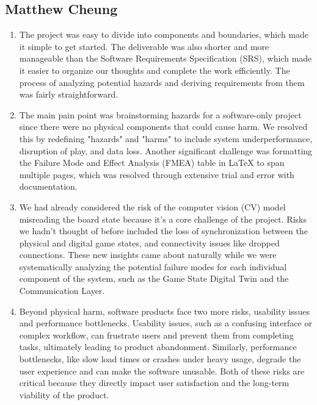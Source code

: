 \documentclass{article}
\begin{document}
\subsection*{Matthew Cheung}\label{subsec:matthew-cheung-reflection}
\begin{enumerate}
    \item The project was easy to divide into components and boundaries, which made it simple to get started.
    The deliverable was also shorter and more manageable than the Software Requirements Specification (SRS), which made it easier to organize our thoughts and complete the work efficiently.
    The process of analyzing potential hazards and deriving requirements from them was fairly straightforward.

    \item The main pain point was brainstorming hazards for a software-only project since there were no physical components that could cause harm.
    We resolved this by redefining "hazards" and "harms" to include system underperformance, disruption of play, and data loss.
    Another significant challenge was formatting the Failure Mode and Effect Analysis (FMEA) table in LaTeX to span multiple pages, which was resolved through extensive trial and error with documentation.

    \item We had already considered the risk of the computer vision (CV) model misreading the board state because it's a core challenge of the project.
    Risks we hadn't thought of before included the loss of synchronization between the physical and digital game states, and connectivity issues like dropped connections.
    These new insights came about naturally while we were systematically analyzing the potential failure modes for each individual component of the system, such as the Game State Digital Twin and the Communication Layer.

    \item Beyond physical harm, software products face two more risks, usability issues and performance bottlenecks.
    Usability issues, such as a confusing interface or complex workflow, can frustrate users and prevent them from completing tasks, ultimately leading to product abandonment.
    Similarly, performance bottlenecks, like slow load times or crashes under heavy usage, degrade the user experience and can make the software unusable.
    Both of these risks are critical because they directly impact user satisfaction and the long-term viability of the product.

\end{enumerate}
\end{document}
